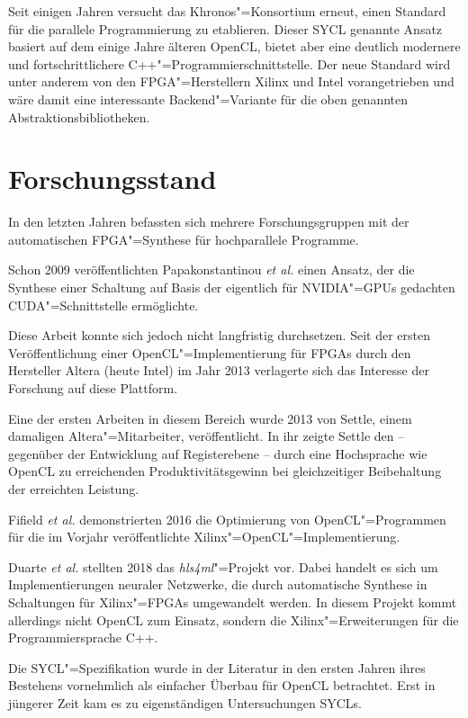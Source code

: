 Seit einigen Jahren versucht das Khronos"=Konsortium erneut, einen Standard für
die parallele Programmierung zu etablieren. Dieser SYCL genannte Ansatz basiert
auf dem einige Jahre älteren OpenCL, bietet aber eine deutlich modernere und
fortschrittlichere C++"=Programmierschnittstelle. Der neue Standard wird unter
anderem von den FPGA"=Herstellern Xilinx und Intel vorangetrieben und wäre damit
eine interessante Backend"=Variante für die oben genannten
Abstraktionsbibliotheken.

\section{Forschungsstand}\label{einleitung:forschung}

In den letzten Jahren befassten sich mehrere Forschungsgruppen mit der
automatischen \mbox{FPGA}"=Synthese für hochparallele Programme.

Schon 2009 veröffentlichten Papakonstantinou \textit{et al.} einen Ansatz, der
die Synthese einer Schaltung auf Basis der eigentlich für NVIDIA"=GPUs gedachten
CUDA"=Schnittstelle ermöglichte. \cite[vgl.][]{papakonstantinou2009} 

Diese Arbeit konnte sich jedoch nicht langfristig durchsetzen. Seit der ersten
Veröffentlichung einer OpenCL"=Implementierung für FPGAs durch den Hersteller
Altera (heute Intel) im Jahr 2013 verlagerte sich das Interesse der Forschung
auf diese Plattform. 

Eine der ersten Arbeiten in diesem Bereich wurde 2013 von Settle, einem
damaligen Altera"=Mitarbeiter, veröffentlicht. In ihr zeigte Settle den
-- gegenüber der Entwicklung auf Registerebene -- durch eine Hochsprache wie
OpenCL zu erreichenden Produktivitätsgewinn bei gleichzeitiger Beibehaltung der
erreichten Leistung. \cite[vgl.][]{settle2013}

Fifield \textit{et al.} demonstrierten 2016 die Optimierung von
OpenCL"=Programmen für die im Vorjahr veröffentlichte
Xilinx"=OpenCL"=Implementierung. \cite[vgl.][]{fifield2016}

Duarte \textit{et al.} stellten 2018 das \textit{hls4ml}"=Projekt vor. Dabei
handelt es sich um Implementierungen neuraler Netzwerke, die durch automatische
Synthese in Schaltungen für Xilinx"=FPGAs umgewandelt werden. In diesem Projekt
kommt allerdings nicht OpenCL zum Einsatz, sondern die Xilinx"=Erweiterungen für
die Programmiersprache C++. \cite[vgl.][]{duarte2018}

Die SYCL"=Spezifikation wurde in der Literatur in den ersten Jahren ihres
Bestehens vornehmlich als einfacher Überbau für OpenCL betrachtet. Erst in
jüngerer Zeit kam es zu eigenständigen Untersuchungen SYCLs.

